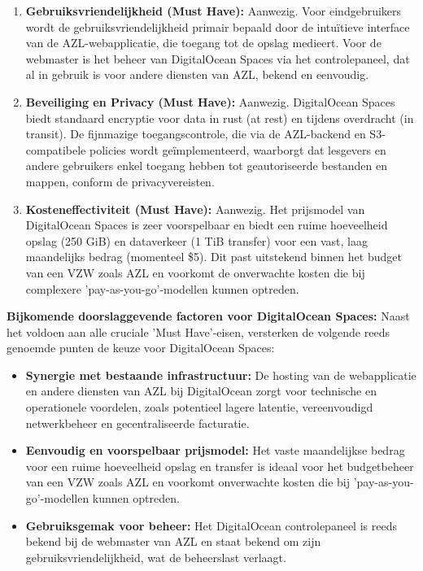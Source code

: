 \begin{enumerate}
    \item \textbf{Gebruiksvriendelijkheid (Must Have):} Aanwezig. Voor eindgebruikers wordt de gebruiksvriendelijkheid primair bepaald door de intuïtieve interface van de AZL-webapplicatie, die toegang tot de opslag medieert. Voor de webmaster is het beheer van DigitalOcean Spaces via het controlepaneel, dat al in gebruik is voor andere diensten van AZL, bekend en eenvoudig.
    \item \textbf{Beveiliging en Privacy (Must Have):} Aanwezig. DigitalOcean Spaces biedt standaard encryptie voor data in rust (at rest) en tijdens overdracht (in transit). De fijnmazige toegangscontrole, die via de AZL-backend en S3-compatibele policies wordt geïmplementeerd, waarborgt dat lesgevers en andere gebruikers enkel toegang hebben tot geautoriseerde bestanden en mappen, conform de privacyvereisten.
    \item \textbf{Kosteneffectiviteit (Must Have):} Aanwezig. Het prijsmodel van DigitalOcean Spaces is zeer voorspelbaar en biedt een ruime hoeveelheid opslag (250 GiB) en dataverkeer (1 TiB transfer) voor een vast, laag maandelijks bedrag (momenteel \$5). Dit past uitstekend binnen het budget van een VZW zoals AZL en voorkomt de onverwachte kosten die bij complexere 'pay-as-you-go'-modellen kunnen optreden.
\end{enumerate}

\textbf{Bijkomende doorslaggevende factoren voor DigitalOcean Spaces:}
Naast het voldoen aan alle cruciale 'Must Have'-eisen, versterken de volgende reeds genoemde punten de keuze voor DigitalOcean Spaces:
\begin{itemize}
    \item \textbf{Synergie met bestaande infrastructuur:} De hosting van de webapplicatie en andere diensten van AZL bij DigitalOcean zorgt voor technische en operationele voordelen, zoals potentieel lagere latentie, vereenvoudigd netwerkbeheer en gecentraliseerde facturatie.
    \item \textbf{Eenvoudig en voorspelbaar prijsmodel:} Het vaste maandelijkse bedrag voor een ruime hoeveelheid opslag en transfer is ideaal voor het budgetbeheer van een VZW zoals AZL en voorkomt onverwachte kosten die bij 'pay-as-you-go'-modellen kunnen optreden.
    \item \textbf{Gebruiksgemak voor beheer:} Het DigitalOcean controlepaneel is reeds bekend bij de webmaster van AZL en staat bekend om zijn gebruiksvriendelijkheid, wat de beheerslast verlaagt.
\end{itemize}

